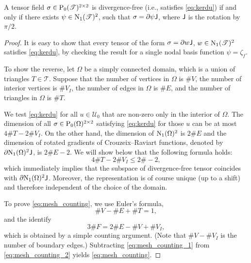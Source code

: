 \documentclass[12pt, reqno, a4paper]{amsart}
\numberwithin{equation}{section}
\numberwithin{theorem}{section}
\numberwithin{remark}{section}
\begin{document}
\begin{lemma}
  \label{th:divfree}
  A tensor field $\sigma \in {{\rm P}_0}({\mathscr{T}})^{2\times 2}$ is divergence-free
  (i.e., satisfies \eqref{eq:kerdu}) if and only if there exists
  $\psi\in {{\rm N}_1}({\mathscr{T}})^2$, such that $\sigma = {\partial} \psi {{\sf J}}$, where ${{\sf J}}$
  is the rotation by $\pi/2$.
\end{lemma}
\begin{proof}
  It is easy to show that every tensor of the form $\sigma = {\partial} w
  {{\sf J}}$, $w \in {{\rm N}_1}({\mathscr{T}})^2$ satisfies \eqref{eq:kerdu}, by checking the
  result for a single nodal basis function $\psi = \zeta_f$.

  To show the reverse, let $\Omega$ be a simply connected domain,
  which is a union of triangles $T \in {\mathscr{T}}$. Suppose that the number of
  vertices in $\Omega$ is $\#V$, the number of interior vertices is
  $\#V_I$, the number of edges in $\Omega$ is $\#E$, and the number of
  triangles in $\Omega$ is $\#T$.

  We test \eqref{eq:kerdu} for all $u \in {\mathscr{U}}_0$ that are non-zero
  only in the interior of $\Omega$. The dimension of all $\sigma \in
  {{\rm P}_0}(\Omega)^{2 \times 2}$ satisfying \eqref{eq:kerdu} for those $u$
  can be at most $4\#T-2\#V_I$. On the other hand, the dimension of
  ${{\rm N}_1}(\Omega)^2$ is $2\# E$ and the dimension of rotated gradients of
  Crouzeix--Raviart functions, denoted by ${\partial} {{\rm N}_1}(\Omega)^2 {{\sf J}}$, is
  $2\# E - 2$. We will show below that the following formula holds:
  \begin{equation}
    \label{eq:mesh_counting}
    4\#T-2\#V_I \leq 2 \# - 2,
  \end{equation}
  which immediately implies that the subspace of divergence-free
  tensor coincides with ${\partial} {{\rm N}_1}(\Omega)^2 {{\sf J}}$. Moreover, the
  representation is of course unique (up to a shift) and therefore
  independent of the choice of the domain.

  To prove \eqref{eq:mesh_counting}, we use Euler's formula,
  \begin{equation}
    \label{eq:mesh_counting_1}
    \#V-\#E+\#T = 1,
  \end{equation}
  and the identify
  \begin{equation}
    \label{eq:mesh_counting_2}
     3\#F=2\#E-\#V+\#V_I,
  \end{equation}
  which is obtained by a simple counting argument. (Note that $\#V -
  \#V_I$ is the number of boundary edges.)  Subtracting
  \eqref{eq:mesh_counting_1} from \eqref{eq:mesh_counting_2} yields
  \eqref{eq:mesh_counting}.
\end{proof}
\end{document}
